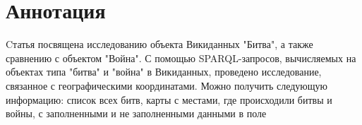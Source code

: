 \section{Аннотация}

Cтатья посвящена исследованию объекта Викиданных "Битва", а также сравнению с объектом "Война". С помощью SPARQL-запросов, вычисляемых на объектах типа "битва" и "война" в Викиданных, проведено исследование, связанное с географическими координатами. Можно получить следующую информацию: список всех битв, карты с местами, где происходили битвы и войны, с заполненными и не заполненными данными в поле %